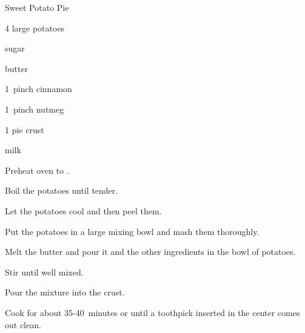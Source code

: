 \begin{recipe}{Sweet Potato Pie}{}{}

\begin{ingredients}
\item 4 large potatoes
\item {} sugar
\item \C{\half} butter
\item 1~pinch cinnamon
\item 1~pinch nutmeg
\item 1 pie crust
\item \C{\half} milk
\end{ingredients}

\begin{directions}
\item Preheat oven to .
\item Boil the potatoes until tender.
\item Let the potatoes cool and then peel them.
\item Put the potatoes in a large mixing bowl and mash them thoroughly.
\item Melt the butter and pour it and the other ingredients in the bowl of potatoes.
\item Stir until well mixed. 
\item Pour the mixture into the crust.
\item Cook for about 35-40~minutes or until a toothpick inserted in the center comes out clean.
\end{directions}

\end{recipe}
